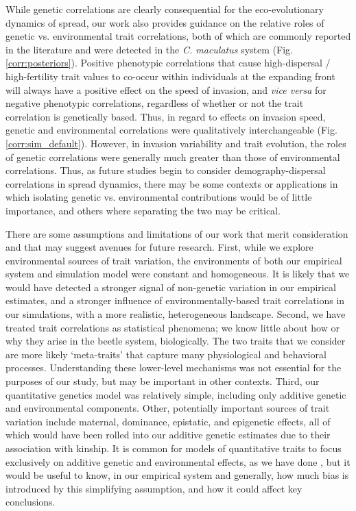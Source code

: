 \documentclass[11pt]{article}
\begin{document}
While genetic correlations are clearly consequential for the eco-evolutionary dynamics of spread, our work also provides guidance on the relative roles of genetic vs. environmental trait correlations, both of which are commonly reported in the literature and were detected in the \textit{C. maculatus} system (Fig. \ref{corr:posteriors}).
Positive phenotypic correlations that cause high-dispersal / high-fertility trait values to co-occur within individuals at the expanding front will always have a positive effect on the speed of invasion, and \textit{vice versa} for negative phenotypic correlations, regardless of whether or not the trait correlation is genetically based.
Thus, in regard to effects on invasion speed, genetic and environmental correlations were qualitatively interchangeable (Fig. \ref{corr:sim_default}).
However, in invasion variability and trait evolution, the roles of genetic correlations were generally much greater than those of environmental correlations.
Thus, as future studies begin to consider demography-dispersal correlations in spread dynamics, there may be some contexts or applications in which isolating genetic vs. environmental contributions would be of little importance, and others where separating the two may be critical. 

There are some assumptions and limitations of our work that merit consideration and that may suggest avenues for future research.
First, while we explore environmental sources of trait variation, the environments of both our empirical system and simulation model were constant and homogeneous. 
It is likely that we would have detected a stronger signal of non-genetic variation in our empirical estimates, and  a stronger influence of environmentally-based trait correlations in our simulations, with a more realistic, heterogeneous landscape. 
Second, we have treated trait correlations as statistical phenomena; we know little about how or why they arise in the beetle system, biologically.
The two traits that we consider are more likely `meta-traits' that capture many physiological and behavioral processes.
Understanding these lower-level mechanisms was not essential for the purposes of our study, but may be important in other contexts. 
Third, our quantitative genetics model was relatively simple, including only additive genetic and environmental components. 
Other, potentially important sources of trait variation include maternal, dominance, epistatic, and epigenetic effects, all of which would have been rolled into our additive genetic estimates due to their association with kinship.
It is common for models of quantitative traits to focus exclusively on additive genetic and environmental effects, as we have done \citep{wilson_ecologists_2010}, but it would be useful to know, in our empirical system and generally, how much bias is introduced by this simplifying assumption, and how it could affect key conclusions. 
\end{document}
